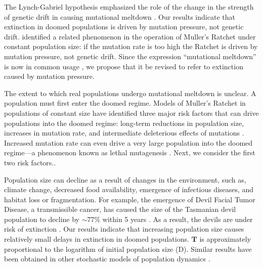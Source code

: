 \documentclass[9pt,lineno]{elife}
\begin{document}
The Lynch-Gabriel hypothesis emphasized the role of the change in the strength of genetic drift in causing mutational meltdown \citep[e.g., ``we refer to this synergism between mutation accumulation and random genetic drift as a mutational meltdown'';][]{lyn93}.  
Our results indicate that extinction in doomed populations is driven by mutation pressure, not genetic drift.  
%
\citet{Gessler_The_1995}  identified a related phenomenon in the operation of Muller's Ratchet under constant population size: if the mutation rate is too high the Ratchet is driven by mutation pressure, not genetic drift.
%
Since the expression ``mutational meltdown'' is now in common usage \citep[e.g.,][]{poo00, row03, Allen_Mutational_2009, McFarland_Tug_2014}, we propose that it be revised to refer to extinction caused by mutation pressure.

The extent to which real populations undergo mutational meltdown is unclear.  A population must first enter the doomed regime.  Models of Muller's Ratchet in populations of constant size
have identified three major risk factors that can drive populations into the doomed regime: long-term reductions in population size,  increases in mutation rate, 
and intermediate deleterious effects of mutations
\citep{Lynch_MUTATION_1990, lyn93, Gabriel_MULLER_1993, lyn95, McFarland_Impact_2013}.  Increased mutation rate can even drive a very large population into the doomed regime---a phenomenon known as lethal mutagenesis \citep{Bull_Theory_2007}.
Next, we consider the first two risk factors..

Population size can decline as a result of changes in the environment, such as, climate change, decreased food availability, emergence of infectious diseases, and habitat loss or fragmentation.  
For example, the emergence of Devil Facial Tumor Disease, a transmissible cancer, has caused the size of the Tasmanian devil population to decline by $\sim$77\% within 5 years \citep{haw06, laz18}.  As a result, the devils are under risk of extinction \citep{mcc09}. 
%
Our results indicate that increasing population size causes relatively small delays in extinction in doomed populations.  
%
$\mathbf{T}$ is approximately proportional to the logarithm of initial population size (D).  
%
Similar results have been obtained in other stochastic models of population dynamics \citep{lan93, Jagers_On_2007}.
\end{document}
